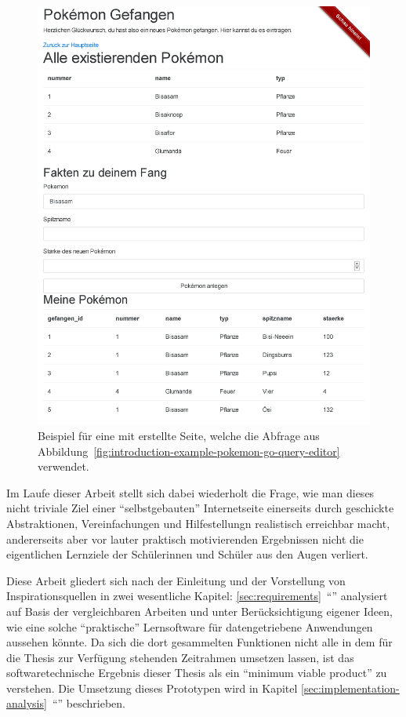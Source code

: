 \begin{figure}[p]
  \includegraphics[width=\textwidth]{images/screenshots/20161019/enduser-pokemongo-catch.png}
  \caption{Beispiel für eine mit \idename{} erstellte Seite, welche die Abfrage aus Abbildung~\ref{fig:introduction-example-pokemon-go-query-editor} verwendet.}
  \label{fig:introduction-example-pokemon-go-catch}
\end{figure}

Im Laufe dieser Arbeit stellt sich dabei wiederholt die Frage, wie man dieses nicht triviale Ziel einer "`selbstgebauten"' Internetseite einerseits durch geschickte Abstraktionen, Vereinfachungen und Hilfestellungn realistisch erreichbar macht, andererseits aber vor lauter praktisch motivierenden Ergebnissen nicht die eigentlichen Lernziele der Schülerinnen und Schüler aus den Augen verliert.

Diese Arbeit gliedert sich nach der Einleitung und der Vorstellung von Inspirationsquellen in zwei wesentliche Kapitel: \ref{sec:requirements}~"`"' analysiert auf Basis der vergleichbaren Arbeiten und unter Berücksichtigung eigener Ideen, wie eine solche "`praktische"' Lernsoftware für datengetriebene Anwendungen aussehen könnte. Da sich die dort gesammelten Funktionen nicht alle in dem für die Thesis zur Verfügung stehenden Zeitrahmen umsetzen lassen, ist das softwaretechnische Ergebnis dieser Thesis als ein "`minimum viable product"' zu verstehen. Die Umsetzung dieses Prototypen wird in Kapitel \ref{sec:implementation-analysis}~"`"' beschrieben.

